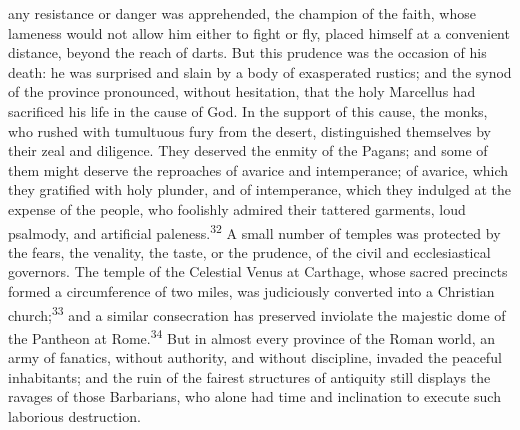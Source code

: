 any resistance or danger was apprehended, the champion of the
faith, whose lameness would not allow him either to fight or fly,
placed himself at a convenient distance, beyond the reach of
darts. But this prudence was the occasion of his death: he was
surprised and slain by a body of exasperated rustics; and the
synod of the province pronounced, without hesitation, that the
holy Marcellus had sacrificed his life in the cause of God. In
the support of this cause, the monks, who rushed with tumultuous
fury from the desert, distinguished themselves by their zeal and
diligence. They deserved the enmity of the Pagans; and some of
them might deserve the reproaches of avarice and intemperance; of
avarice, which they gratified with holy plunder, and of
intemperance, which they indulged at the expense of the people,
who foolishly admired their tattered garments, loud psalmody, and
artificial paleness.\textsuperscript{32} A small number of temples was protected
by the fears, the venality, the taste, or the prudence, of the
civil and ecclesiastical governors. The temple of the Celestial
Venus at Carthage, whose sacred precincts formed a circumference
of two miles, was judiciously converted into a Christian church;\textsuperscript{33}
and a similar consecration has preserved inviolate the
majestic dome of the Pantheon at Rome.\textsuperscript{34} But in almost every
province of the Roman world, an army of fanatics, without
authority, and without discipline, invaded the peaceful
inhabitants; and the ruin of the fairest structures of antiquity
still displays the ravages of those Barbarians, who alone had
time and inclination to execute such laborious destruction.




